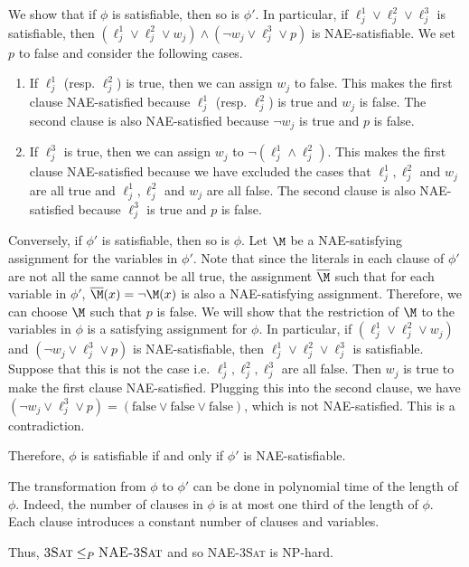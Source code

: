 We show that if $\phi$ is satisfiable, then so is $\phi'$. In particular, if $\ell_{j}^{1}\vee \ell_{j}^{2}\vee \ell_{j}^{3}$ is satisfiable, then $(\ell_{j}^{1}\vee \ell_{j}^{2}\vee w_j)\wedge (\neg w_j \vee \ell_{j}^{3}\vee p)$ is NAE-satisfiable. We set $p$ to false and consider the following cases.
\begin{enumerate}
  \item If $\ell_{j}^{1}$ (resp. $\ell_{j}^{2}$) is true, then we can assign $w_j$ to false. This makes the first clause NAE-satisfied because $\ell_{j}^{1}$ (resp. $\ell_{j}^{2}$) is true and $w_j$ is false. The second clause is also NAE-satisfied because $\neg w_j$ is true and $p$ is false.
  \item If $\ell_{j}^{3}$ is true, then we can assign $w_j$ to $\neg(\ell_{j}^1\wedge \ell_{j}^2)$. This makes the first clause NAE-satisfied because we have excluded the cases that $\ell_{j}^1, \ell_{j}^2$ and $w_j$ are all true and $\ell_{j}^1, \ell_{j}^2$ and $w_j$ are all false. The second clause is also NAE-satisfied because $\ell_{j}^{3}$ is true and $p$ is false.
\end{enumerate}

Conversely, if $\phi'$ is satisfiable, then so is $\phi$. Let $\M$ be a NAE-satisfying assignment for the variables in $\phi'$. Note that since the literals in each clause of $\phi'$ are not all the same cannot be all true, the assignment $\overline{\M}$ such that for each variable in $\phi'$, $\overline{\M}(x) = \neg \M(x)$ is also a NAE-satisfying assignment. Therefore, we can choose $\M$ such that $p$ is false. We will show that the restriction of $\M$ to the variables in $\phi$ is a satisfying assignment for $\phi$. In particular, if $(\ell_{j}^{1}\vee \ell_{j}^{2}\vee w_j)$ and $ (\neg w_j \vee \ell_{j}^{3}\vee p)$ is NAE-satisfiable, then $\ell_{j}^{1}\vee \ell_{j}^{2}\vee \ell_{j}^{3}$ is satisfiable. Suppose that this is not the case i.e. $\ell_{j}^{1}, \ell_{j}^{2}, \ell_{j}^{3}$ are all false. Then $w_j$ is true to make the first clause NAE-satisfied. Plugging this into the second clause, we have $(\neg w_j \vee \ell_{j}^{3}\vee p) = (\text{false} \vee \text{false} \vee \text{false})$, which is not NAE-satisfied. This is a contradiction.

Therefore, $\phi$ is satisfiable if and only if $\phi'$ is NAE-satisfiable.

The transformation from $\phi$ to $\phi'$ can be done in polynomial time of the length of $\phi$. Indeed, the number of clauses in $\phi$ is at most one third of the length of $\phi$. Each clause introduces a constant number of clauses and variables.

Thus, $\textsc{3Sat}\le_P \textsc{NAE-3Sat}$ and so \textsc{NAE-3Sat} is NP-hard.
